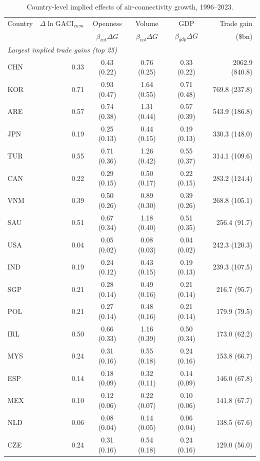 \begin{table}[t]
\centering
\caption{Country-level implied effects of air-connectivity growth, 1996--2023.}
\label{tab:country}
\begin{threeparttable}
\scriptsize
\begin{tabular}{lrcccr}
\toprule
Country & $\Delta\ln\mathrm{GACI}_{cwm}$ & Openness & Volume & GDP & Trade gain \\
 & & $\beta_{int}\Delta G$ & $\beta_{vol}\Delta G$ & $\beta_{gdp}\Delta G$ & (\$bn) \\
\midrule
\multicolumn{6}{l}{\emph{Largest implied trade gains (top 25)}}\\
CHN & 0.33 & 0.43 (0.22) & 0.76 (0.25) & 0.33 (0.22) & 2062.9 (840.8) \\
KOR & 0.71 & 0.93 (0.47) & 1.64 (0.55) & 0.71 (0.48) & 769.8 (237.8) \\
ARE & 0.57 & 0.74 (0.38) & 1.31 (0.44) & 0.57 (0.39) & 543.9 (186.8) \\
JPN & 0.19 & 0.25 (0.13) & 0.44 (0.15) & 0.19 (0.13) & 330.3 (148.0) \\
TUR & 0.55 & 0.71 (0.36) & 1.26 (0.42) & 0.55 (0.37) & 314.1 (109.6) \\
CAN & 0.22 & 0.29 (0.15) & 0.50 (0.17) & 0.22 (0.15) & 283.2 (124.4) \\
VNM & 0.39 & 0.50 (0.26) & 0.89 (0.30) & 0.39 (0.26) & 268.8 (105.1) \\
SAU & 0.51 & 0.67 (0.34) & 1.18 (0.40) & 0.51 (0.35) & 256.4 (91.7) \\
USA & 0.04 & 0.05 (0.02) & 0.08 (0.03) & 0.04 (0.02) & 242.3 (120.3) \\
IND & 0.19 & 0.24 (0.12) & 0.43 (0.15) & 0.19 (0.13) & 239.3 (107.5) \\
SGP & 0.21 & 0.28 (0.14) & 0.49 (0.16) & 0.21 (0.14) & 216.7 (95.7) \\
POL & 0.21 & 0.27 (0.14) & 0.48 (0.16) & 0.21 (0.14) & 179.9 (79.5) \\
IRL & 0.50 & 0.66 (0.33) & 1.16 (0.39) & 0.50 (0.34) & 173.0 (62.2) \\
MYS & 0.24 & 0.31 (0.16) & 0.55 (0.18) & 0.24 (0.16) & 153.8 (66.7) \\
ESP & 0.14 & 0.18 (0.09) & 0.32 (0.11) & 0.14 (0.09) & 146.0 (67.8) \\
MEX & 0.10 & 0.12 (0.06) & 0.22 (0.07) & 0.10 (0.06) & 141.8 (67.7) \\
NLD & 0.06 & 0.08 (0.04) & 0.14 (0.05) & 0.06 (0.04) & 138.5 (67.6) \\
CZE & 0.24 & 0.31 (0.16) & 0.54 (0.18) & 0.24 (0.16) & 129.0 (56.0) \\

\end{tabular}
\end{threeparttable}
\end{table}
